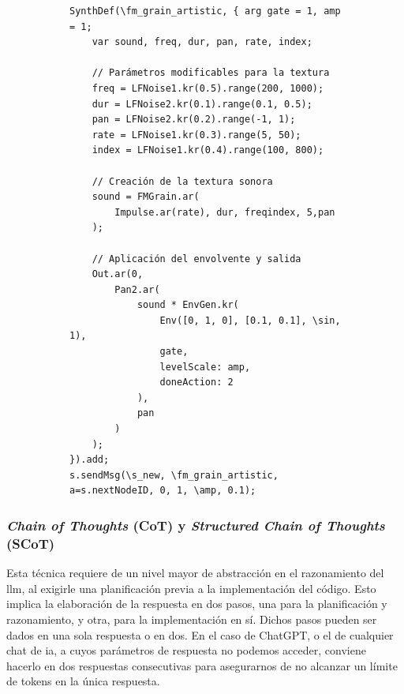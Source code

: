 \begin{figure}
\begin{subfigure}{.48\textwidth}
        \begin{lstlisting}[style=SuperCollider-IDE, basicstyle=\footnotesize\ttfamily, numbers=none]
SynthDef(\fm_grain_artistic, { arg gate = 1, amp = 1;
    var sound, freq, dur, pan, rate, index;

    // Parámetros modificables para la textura
    freq = LFNoise1.kr(0.5).range(200, 1000);
    dur = LFNoise2.kr(0.1).range(0.1, 0.5); 
    pan = LFNoise2.kr(0.2).range(-1, 1); 
    rate = LFNoise1.kr(0.3).range(5, 50); 
    index = LFNoise1.kr(0.4).range(100, 800); 

    // Creación de la textura sonora
    sound = FMGrain.ar(
        Impulse.ar(rate), dur, freqindex, 5,pan               
    );

    // Aplicación del envolvente y salida
    Out.ar(0,
        Pan2.ar(
            sound * EnvGen.kr(
                Env([0, 1, 0], [0.1, 0.1], \sin, 1),
                gate,
                levelScale: amp,
                doneAction: 2
            ),
            pan
        )
    );
}).add;
s.sendMsg(\s_new, \fm_grain_artistic, a=s.nextNodeID, 0, 1, \amp, 0.1);              
        \end{lstlisting}
    \end{subfigure}
    \source{\propio}
    \label{fig:chatgpt_zero_shot_vs_few_shot}
\end{figure}

\subsubsection{\emph{Chain of Thoughts} (CoT) y \emph{Structured Chain of Thoughts} (SCoT)}

Esta técnica requiere de un nivel mayor de abstracción en el razonamiento del \gls{llm}, al exigirle una planificación previa a la implementación del código. Esto implica la elaboración de la respuesta en dos pasos, una para la planificación y razonamiento, y otra, para la implementación en sí. Dichos pasos pueden ser dados en una sola respuesta o en dos. En el caso de ChatGPT, o el de cualquier chat de \gls{ia}, a cuyos parámetros de respuesta no podemos acceder, conviene hacerlo en dos respuestas consecutivas para asegurarnos de no alcanzar un límite de tokens en la única respuesta. 

